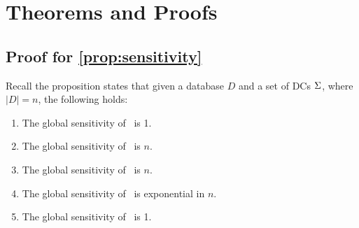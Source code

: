 \appendix

\section{Theorems and Proofs}
\subsection{Proof for \cref{prop:sensitivity}}
\label{app:proof_sensitivity}
Recall the proposition states that given a database $D$ and a set of DCs ${\Sigma}$, where $|D|=n$, the following holds:
\begin{enumerate}
    \item The global sensitivity of \drastic\ is 1. 
    \item The global sensitivity of 
    \mininconsistency\ is $n$.       
    \item The global sensitivity of \problematic\ is $n$.
    \item The global sensitivity of \maxconsistency\ is exponential in $n$.
    \item The global sensitivity of \repair\ is 1.
\end{enumerate}
